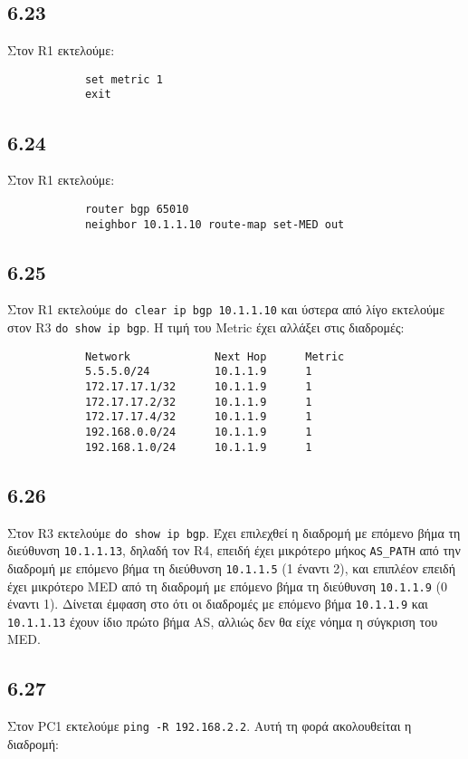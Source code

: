 \documentclass[a4paper, 12pt]{article}
\begin{document}
	\subsection*{6.23}
		Στον R1 εκτελούμε:
		
		\begin{verbatim}
			set metric 1
			exit
		\end{verbatim}

	\subsection*{6.24}
		Στον R1 εκτελούμε:
		
		\begin{verbatim}
			router bgp 65010
			neighbor 10.1.1.10 route-map set-MED out
		\end{verbatim}

	\subsection*{6.25}
		Στον R1 εκτελούμε \verb|do clear ip bgp 10.1.1.10| και ύστερα από λίγο εκτελούμε στον R3 \verb|do show ip bgp|. Η τιμή του Metric έχει αλλάξει στις διαδρομές:
		
		\begin{verbatim}
			Network             Next Hop      Metric
			5.5.5.0/24          10.1.1.9      1
			172.17.17.1/32      10.1.1.9      1
			172.17.17.2/32      10.1.1.9      1
			172.17.17.4/32      10.1.1.9      1
			192.168.0.0/24      10.1.1.9      1
			192.168.1.0/24      10.1.1.9      1
		\end{verbatim}

	\subsection*{6.26}
		Στον R3 εκτελούμε \verb|do show ip bgp|. Έχει επιλεχθεί η διαδρομή με επόμενο βήμα τη διεύθυνση \verb|10.1.1.13|, δηλαδή τον R4, επειδή έχει μικρότερο μήκος \verb|AS_PATH| από την διαδρομή με επόμενο βήμα τη διεύθυνση \verb|10.1.1.5| (1 έναντι 2), και επιπλέον επειδή έχει μικρότερο MED από τη διαδρομή με επόμενο βήμα τη διεύθυνση \verb|10.1.1.9| (0 έναντι 1). Δίνεται έμφαση στο ότι οι διαδρομές με επόμενο βήμα \verb|10.1.1.9| και \verb|10.1.1.13| έχουν ίδιο πρώτο βήμα AS, αλλιώς δεν θα είχε νόημα η σύγκριση του MED.
		
	\subsection*{6.27}
		Στον PC1 εκτελούμε \verb|ping -R 192.168.2.2|. Αυτή τη φορά ακολουθείται η διαδρομή:
		
\end{document}
